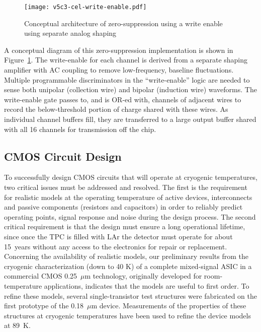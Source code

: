 \begin{figure}[htbp]
\centering
\texttt{[image: v5c3-cel-write-enable.pdf]}
\caption[Conceptual architecture of zero-suppression]{Conceptual architecture of zero-suppression using a write enable using separate analog shaping}
\label{fig:ce-elec-write-enable}
\end{figure}


A conceptual diagram of this zero-suppression implementation is shown
in Figure~\ref{fig:ce-elec-write-enable}. The write-enable for each channel is derived from a separate
shaping amplifier with AC coupling to remove low-frequency, baseline
fluctuations. Multiple programmable discriminators in the
``write-enable'' logic are
needed to sense both unipolar (collection wire) and bipolar (induction
wire) waveforms.  The write-enable gate passes to, and is OR-ed with,
channels of adjacent wires to record the below-threshold portion of
charge shared with these wires. As individual channel buffers fill, they
are transferred to a large output buffer shared with all 16
channels for transmission off the chip.

\subsection{CMOS Circuit Design}

To successfully design CMOS circuits that will operate at cryogenic 
temperatures, two critical issues must be addressed and resolved. 
The first is the requirement for realistic models at the operating temperature 
of active devices, interconnects and passive components (resistors and 
capacitors) in order to reliably predict operating points, signal response 
and noise during the design process. The second critical requirement is 
that the design must ensure a long operational lifetime, since once the TPC is filled 
with LAr the detector must operate for about 15~years without any access to the 
electronics for repair or replacement. Concerning the availability of realistic models, 
our preliminary results from the cryogenic characterization (down to 40 K) of a complete 
mixed-signal ASIC \cite{CMOS-Compton} in a commercial CMOS 0.25~$\mu$m technology, 
originally developed for room-temperature applications, indicates that the models 
are useful to first order. To refine these models, several 
single-transistor test structures were fabricated on the first prototype of the 0.18~$\mu$m device. 
Measurements of the properties of these structures at cryogenic temperatures 
have been used to refine the device models at 89~K. 

